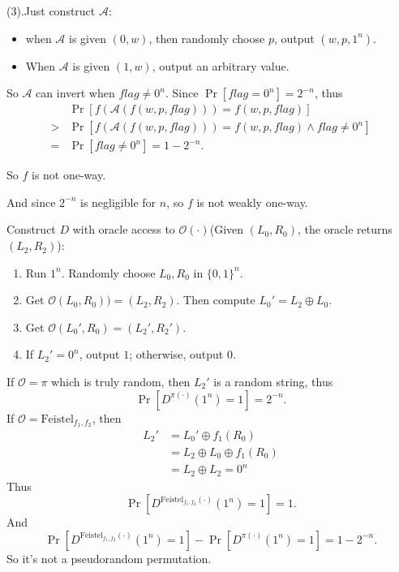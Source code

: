 \documentclass[a4paper]{article}
\newcommand{\Feistel}{\text{Feistel}}
\newcommand{\A}{\mathcal{A}}
\newcommand{\OO}{\mathcal{O}}
\newenvironment{problem}[2][Problem]{\begin{trivlist}
\item[\hskip \labelsep {\bfseries #1}\hskip \labelsep {\bfseries #2.}]}{\end{trivlist}}
\begin{document}
\begin{problem}{7.11}
(3).Just construct $\A$: \begin{itemize}
    \item when $\A$ is given $(0,w)$, then randomly choose $p$, output $(w,p,1^n)$.
    \item When $\A$ is given $(1,w)$, output an arbitrary value.
\end{itemize} 
So $\A$ can invert when $flag\ne 0^n$. Since $\Pr[flag=0^n]=2^{-n}$, thus
\begin{align*}
    &\Pr[f(\A(f(w,p,flag)))=f(w,p,flag)]\\
    >&\Pr[f(\A(f(w,p,flag)))=f(w,p,flag)\land flag\ne0^n]\\
    =&\Pr[flag\ne0^n]=1-2^{-n}.
\end{align*}\par
So $f$ is not one-way.\par
And since $2^{-n}$ is negligible for $n$, so $f$ is not weakly one-way. \par
\end{problem}

\begin{problem}{7.16}
Construct $D$ with oracle access to $\OO(\cdot)$(Given $(L_0,R_0)$, the oracle returns $(L_2,R_2)$):
\begin{enumerate}
    \item Run $1^n$. Randomly choose $L_0,R_0$ in $\{0,1\}^n$. 
    \item Get $\OO(L_0,R_0))=(L_2,R_2)$. Then compute $L_0'=L_2\oplus L_0$.
    \item Get $\OO(L_0',R_0)=(L_2',R_2')$. 
    \item If $L_2'=0^n$, output $1$; otherwise, output $0$.
\end{enumerate}
If $\OO=\pi$ which is truly random, then $L_2'$ is a random string, thus \[\Pr[D^{\pi(\cdot)}(1^n)=1]=2^{-n}.\]
If $\OO=\Feistel_{f_1,f_2}$, then 
\begin{align*}
    L_2'&=L_0'\oplus f_1(R_0)\\
    &=L_2\oplus L_0\oplus f_1(R_0)\\
    &=L_2\oplus L_2=0^n
\end{align*}
Thus \[\Pr[D^{\Feistel_{f_1,f_2}(\cdot)}(1^n)=1]=1.\]
And 
\[\Pr[D^{\Feistel_{f_1,f_2}(\cdot)}(1^n)=1]-\Pr[D^{\pi(\cdot)}(1^n)=1]=1-2^{-n}.\]
So it's not a pseudorandom permutation.
\end{problem}
\end{document}
